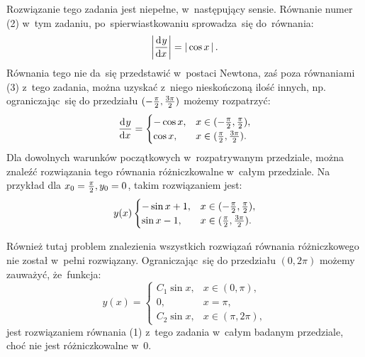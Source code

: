 \documentclass[a4paper,11pt]{article}
\begin{document}
\vspace{\spaceTwo}








\start {}  Rozwiązanie tego zadania jest
niepełne, w~następujący sensie. Równanie numer (2) w~tym zadaniu,
po~spierwiastkowaniu sprowadza~się do~równania:
\begin{equation*}
  \left| \frac{ \mathrm{d}^{  } {  y  } }{ \mathrm{d} {  x  }^{  } } \right| = \left| \,  \cos x  \, \right|.
\end{equation*}
Równania tego nie da~się przedstawić w~postaci Newtona, zaś poza
równaniami (3) z~tego zadania, można uzyskać z~niego nieskończoną
ilość innych, np. ograniczając~się do przedziału
$( -\frac{ \pi }{ 2 }, \frac{ 3 \pi }{ 2 } )$ możemy rozpatrzyć:
\begin{equation*}
  \frac{ \mathrm{d}^{  } {  y  } }{ \mathrm{d} {  x  }^{  } } =
  \begin{cases}
    -\cos x, & x \in ( -\frac{ \pi }{ 2 }, \frac{ \pi }{ 2 } ), \\
    \cos x, & x \in ( \frac{ \pi }{ 2 }, \frac{ 3 \pi }{ 2 } ).
  \end{cases}
\end{equation*}
Dla dowolnych warunków początkowych w~rozpatrywanym przedziale, można
znaleźć rozwiązania tego równania różniczkowalne w~całym przedziale.
Na przykład dla $x_{ 0 } = \frac{ \pi }{ 2 }, y_{ 0 } = 0$, takim
rozwiązaniem jest:
\begin{equation*}
  y( x )
  \begin{cases}
    -\sin x + 1, & x \in ( -\frac{ \pi }{ 2 }, \frac{ \pi }{ 2 } ), \\
    \sin x - 1, & x \in ( \frac{ \pi }{ 2 }, \frac{ 3 \pi }{ 2 } ).
  \end{cases}
\end{equation*}

\vspace{\spaceFour}


\start {}  Również tutaj problem znalezienia
wszystkich rozwiązań równania różniczkowego nie został w~pełni
rozwiązany. Ograniczając~się do przedziału $( 0, 2 \pi )$ możemy
zauważyć, że~funkcja:
\begin{equation*}
  y( x ) =
  \begin{cases}
    C_{ 1 } \sin x,& x \in ( 0, \pi ), \\
    0, & x = \pi, \\
    C_{ 2 } \sin x,& x \in ( \pi, 2 \pi ),
  \end{cases}
\end{equation*}
jest rozwiązaniem równania (1) z~tego zadania w~całym badanym
przedziale, choć nie jest różniczkowalne w~0.
\end{document}

